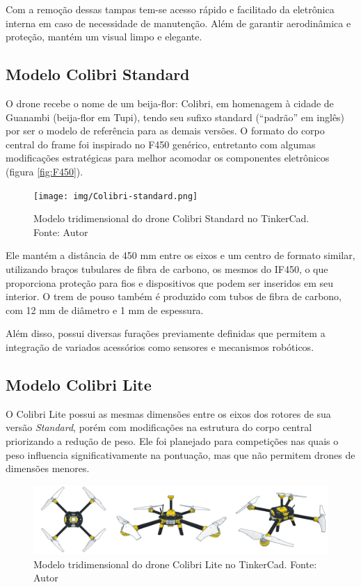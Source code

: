 \documentclass[conference]{IEEEtran}
\begin{document}
Com a remoção dessas tampas tem-se acesso rápido e facilitado da eletrônica interna em caso de necessidade de manutenção. Além de garantir aerodinâmica e proteção, mantém um visual limpo e elegante.

\subsection{Modelo Colibri Standard}

O drone recebe o nome de um beija-flor: Colibri, em homenagem à cidade de Guanambi (beija-flor em Tupi), tendo seu sufixo standard (“padrão” em inglês) por ser o modelo de referência para as demais versões. O formato do corpo central do frame foi inspirado no F450 genérico, entretanto com algumas modificações estratégicas para melhor acomodar os componentes eletrônicos (figura \ref{fig:F450}).

\begin{figure}[!htb]
    \centering
    \texttt{[image: img/Colibri-standard.png]} 
    \caption{Modelo tridimensional do drone Colibri Standard no TinkerCad. Fonte: Autor}
    \label{fig:ColibriStandard}
\end{figure}

Ele mantém a distância de 450 mm entre os eixos e um centro de formato similar, utilizando braços tubulares de fibra de carbono, os mesmos do IF450, o que proporciona proteção para fios e dispositivos que podem ser inseridos em seu interior. O trem de pouso também é produzido com tubos de fibra de carbono, com 12 mm de diâmetro e 1 mm de espessura. 

Além disso, possui diversas furações previamente definidas que permitem a integração de variados acessórios como sensores e mecanismos robóticos.

\subsection{Modelo Colibri Lite}

O Colibri Lite possui as mesmas dimensões entre os eixos dos rotores de sua versão \textit{Standard}, porém com modificações na estrutura do corpo central priorizando a redução de peso. Ele foi planejado para competições nas quais o peso influencia significativamente na pontuação, mas que não permitem drones de dimensões menores.

\begin{figure}[!htb]
    \centering
    \includegraphics[scale=0.14]{img/Colibri-lite.png} 
    \caption{Modelo tridimensional do drone Colibri Lite no TinkerCad. Fonte: Autor}
    \label{fig:my_label}
\end{figure}
\end{document}
